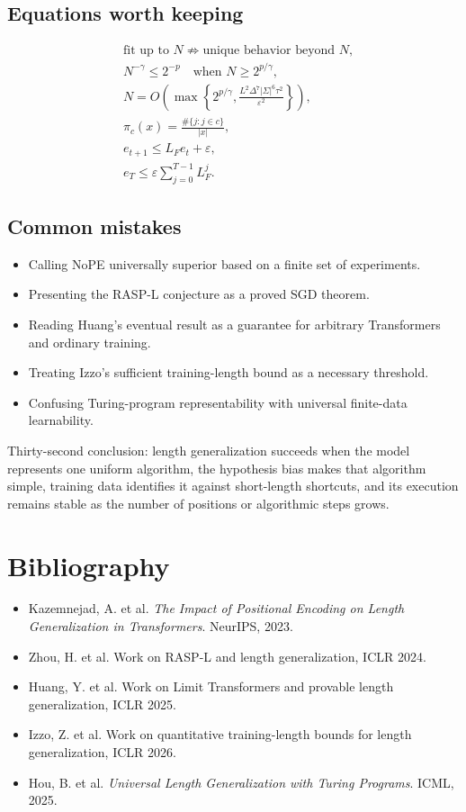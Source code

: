 \documentclass[11pt,a4paper,oneside,openany]{memoir}
\theoremstyle{definition}
\begin{document}
\section{Equations worth keeping}
\begin{align*}
&\text{fit up to }N\not\Rightarrow\text{unique behavior beyond }N,\\
&N^{-\gamma}\le2^{-p}\quad\text{when }N\ge2^{p/\gamma},\\
&N=O\!\left(\max\left\{2^{p/\gamma},\frac{L^2\Delta^7|\Sigma|^6\tau^2}{\varepsilon^2}\right\}\right),\\
&\pi_c(x)=\frac{\#\{j:j\in c\}}{|x|},\\
&e_{t+1}\le L_Fe_t+\varepsilon,\\
&e_T\le\varepsilon\sum_{j=0}^{T-1}L_F^j.
\end{align*}

\section{Common mistakes}
\begin{itemize}
\item Calling NoPE universally superior based on a finite set of experiments.
\item Presenting the RASP-L conjecture as a proved SGD theorem.
\item Reading Huang's eventual result as a guarantee for arbitrary Transformers and ordinary training.
\item Treating Izzo's sufficient training-length bound as a necessary threshold.
\item Confusing Turing-program representability with universal finite-data learnability.
\end{itemize}

\begin{presentbox}
Thirty-second conclusion: length generalization succeeds when the model represents one uniform algorithm, the hypothesis bias makes that algorithm simple, training data identifies it against short-length shortcuts, and its execution remains stable as the number of positions or algorithmic steps grows.
\end{presentbox}

\chapter*{Bibliography}
\begin{itemize}
\item Kazemnejad, A. et al. \emph{The Impact of Positional Encoding on Length Generalization in Transformers}. NeurIPS, 2023.
\item Zhou, H. et al. Work on RASP-L and length generalization, ICLR 2024.
\item Huang, Y. et al. Work on Limit Transformers and provable length generalization, ICLR 2025.
\item Izzo, Z. et al. Work on quantitative training-length bounds for length generalization, ICLR 2026.
\item Hou, B. et al. \emph{Universal Length Generalization with Turing Programs}. ICML, 2025.
\end{itemize}
\end{document}
